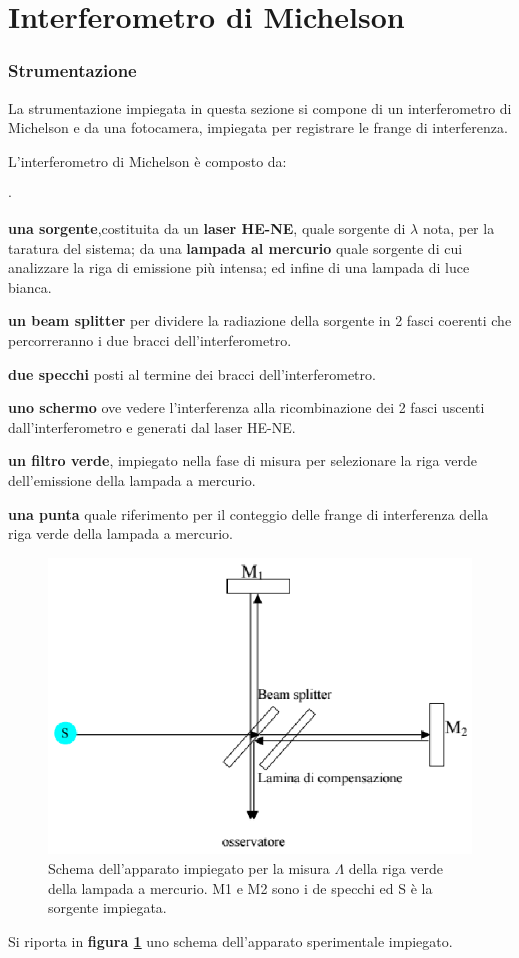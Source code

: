 \newpage
\part{Interferometro di Michelson }

\section{Strumentazione}
La strumentazione impiegata in questa sezione  si 
compone di un interferometro di Michelson e da una fotocamera,
impiegata per registrare le frange di interferenza.

L'interferometro di Michelson è composto da:
\begin{list}{$\cdot$}{}
\item \textbf{una sorgente},costituita da un \textbf{laser HE-NE}, 
quale sorgente di $\lambda$ nota,
per la taratura del sistema; da una \textbf{lampada al mercurio} quale 
sorgente di cui analizzare la riga di emissione più intensa; ed infine di una lampada
di luce bianca.
\item \textbf{un beam splitter} per dividere la radiazione della sorgente
in 2 fasci coerenti che percorreranno i
due bracci dell'interferometro.
\item \textbf{due specchi} posti al termine dei bracci 
dell'interferometro. 
\item \textbf{uno schermo} ove vedere l'interferenza alla ricombinazione dei 2 
fasci uscenti dall'interferometro e generati dal laser HE-NE.
\item \textbf{un filtro verde}, impiegato nella fase di misura per selezionare 
la riga verde 
dell'emissione della lampada a mercurio.
\item \textbf{una punta} quale riferimento per il conteggio delle frange di interferenza 
della riga verde della lampada a mercurio.
\end{list}
\bigskip


\begin{figure} [!h]
	\centering
	\includegraphics[scale=0.5]{./pictures/immagine2}
	\caption{Schema dell'apparato impiegato per la misura $\Lambda$ della riga verde della lampada a mercurio.
	M1 e M2 sono i de specchi ed S è la sorgente impiegata.}
	\label{fig:schema_appar2}
\end{figure}
Si riporta in \textbf{figura \ref{fig:schema_appar2} }uno schema dell'apparato sperimentale impiegato. 